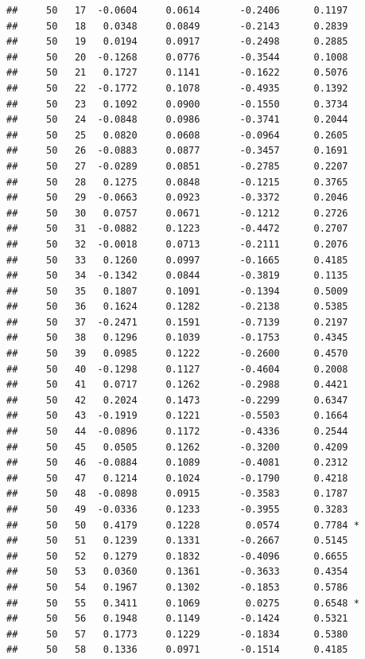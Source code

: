 \documentclass[
]{article}
\begin{document}
\begin{verbatim}
##     50   17  -0.0604     0.0614       -0.2406      0.1197  
##     50   18   0.0348     0.0849       -0.2143      0.2839  
##     50   19   0.0194     0.0917       -0.2498      0.2885  
##     50   20  -0.1268     0.0776       -0.3544      0.1008  
##     50   21   0.1727     0.1141       -0.1622      0.5076  
##     50   22  -0.1772     0.1078       -0.4935      0.1392  
##     50   23   0.1092     0.0900       -0.1550      0.3734  
##     50   24  -0.0848     0.0986       -0.3741      0.2044  
##     50   25   0.0820     0.0608       -0.0964      0.2605  
##     50   26  -0.0883     0.0877       -0.3457      0.1691  
##     50   27  -0.0289     0.0851       -0.2785      0.2207  
##     50   28   0.1275     0.0848       -0.1215      0.3765  
##     50   29  -0.0663     0.0923       -0.3372      0.2046  
##     50   30   0.0757     0.0671       -0.1212      0.2726  
##     50   31  -0.0882     0.1223       -0.4472      0.2707  
##     50   32  -0.0018     0.0713       -0.2111      0.2076  
##     50   33   0.1260     0.0997       -0.1665      0.4185  
##     50   34  -0.1342     0.0844       -0.3819      0.1135  
##     50   35   0.1807     0.1091       -0.1394      0.5009  
##     50   36   0.1624     0.1282       -0.2138      0.5385  
##     50   37  -0.2471     0.1591       -0.7139      0.2197  
##     50   38   0.1296     0.1039       -0.1753      0.4345  
##     50   39   0.0985     0.1222       -0.2600      0.4570  
##     50   40  -0.1298     0.1127       -0.4604      0.2008  
##     50   41   0.0717     0.1262       -0.2988      0.4421  
##     50   42   0.2024     0.1473       -0.2299      0.6347  
##     50   43  -0.1919     0.1221       -0.5503      0.1664  
##     50   44  -0.0896     0.1172       -0.4336      0.2544  
##     50   45   0.0505     0.1262       -0.3200      0.4209  
##     50   46  -0.0884     0.1089       -0.4081      0.2312  
##     50   47   0.1214     0.1024       -0.1790      0.4218  
##     50   48  -0.0898     0.0915       -0.3583      0.1787  
##     50   49  -0.0336     0.1233       -0.3955      0.3283  
##     50   50   0.4179     0.1228        0.0574      0.7784 *
##     50   51   0.1239     0.1331       -0.2667      0.5145  
##     50   52   0.1279     0.1832       -0.4096      0.6655  
##     50   53   0.0360     0.1361       -0.3633      0.4354  
##     50   54   0.1967     0.1302       -0.1853      0.5786  
##     50   55   0.3411     0.1069        0.0275      0.6548 *
##     50   56   0.1948     0.1149       -0.1424      0.5321  
##     50   57   0.1773     0.1229       -0.1834      0.5380  
##     50   58   0.1336     0.0971       -0.1514      0.4185  

\end{verbatim}
\end{document}
